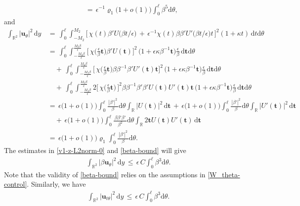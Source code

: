 \documentclass[10pt, reqno]{amsart}
\numberwithin{equation}{section}
\theoremstyle{definition}
\begin{document}
{{\begin{align}
\nonumber\\[2mm]
 & \,=\,
 \epsilon^{-1}\varrho_1\big(1+o(1)\big) \int_0^{\ell} \beta^5 {\mathrm d}\theta,
 \label{v1-s-L2norm}
\end{align}
 and
\begin{align}
 \int_{{\mathbb R}^2} |{\mathbf u}_{\theta}|^2 \,{\mathrm d} y
 &\,=\,
 \int_0^{\ell} \int_{-M_2}^{M_2}
 \Big[\,
 \chi(t)\beta' U\big(\beta t/\epsilon\big)
 \,+\,
 \epsilon^{-1} \chi(t)\beta \beta' U'\big(\beta t/\epsilon\big)t
 \, \Big]^2 (1+\kappa t )\,{\mathrm d}t{\mathrm d}\theta
\nonumber\\[2mm]
 &\,=\,
 \int_0^{\ell} \int_{-\frac{M_2\beta}{\epsilon}}^{\frac{M_2\beta}{\epsilon}}
 \Big[\,\chi\Big(\frac{\epsilon}{\beta}{\mathbf t}\Big)\beta'U({\mathbf t})\Big]^2\,
 \big(1+\epsilon\kappa\beta^{-1}{\mathbf t}\big)\frac{\epsilon}{\beta} \,{\mathrm d}{\mathbf t}{\mathrm d}\theta
\nonumber\\[2mm]
 &\quad\,+\,\int_0^{\ell} \int_{-\frac{M_2\beta}{\epsilon}}^{\frac{M_2\beta}{\epsilon}}
 \Big[\,\chi\Big(\frac{\epsilon}{\beta}{\mathbf t}\Big)\beta\beta^{-1} \beta' U'({\mathbf t}){\mathbf t}\Big]^2\,
 \big(1+\epsilon\kappa\beta^{-1}{\mathbf t}\big)\frac{\epsilon}{\beta} \,{\mathrm d}{\mathbf t}{\mathrm d}\theta
\nonumber\\[2mm]
 &\quad\,+\,\int_0^{\ell} \int_{-\frac{M_2\beta}{\epsilon}}^{\frac{M_2\beta}{\epsilon}}
 2\Big[\,\chi\Big(\frac{\epsilon}{\beta}{\mathbf t}\Big)\,\Big]^2 \beta\beta^{-1} \beta'\beta' U({\mathbf t})U'({\mathbf t}){\mathbf t}\,
 \big(1+\epsilon\kappa\beta^{-1}{\mathbf t}\big)\frac{\epsilon}{\beta} \,{\mathrm d}{\mathbf t}{\mathrm d}\theta
\nonumber\\[2mm]
 & \,=\, \epsilon \big(1+o(1)\big)\int_0^{\ell}
 \frac{\, |\beta'|^2\, }{\beta} {\mathrm d}\theta
 \int_{\mathbb R} |U({\mathbf t})|^2 \,{\mathrm d}{\mathbf t}
 \,+\,
 \epsilon \big(1+o(1)\big)\int_0^{\ell}
 \frac{\, |\beta'|^2\, }{\beta} {\mathrm d}\theta
 \int_{\mathbb R} |U'({\mathbf t})|^2 \,{\mathrm d}{\mathbf t}
\nonumber\\[2mm]
 &\quad\,+\,
 \epsilon \big(1+o(1)\big)\int_0^{\ell}
 \frac{\, \beta\beta'\beta'\, }{\beta^2} {\mathrm d}\theta
 \int_{\mathbb R} 2{\mathbf t}U({\mathbf t})U'({\mathbf t}) \,{\mathrm d}{\mathbf t}
\nonumber\\[2mm]
 & \,=\,
 \epsilon \big(1+o(1)\big)
 \varrho_1\int_0^{\ell} \frac{\, |\beta'|^2\, }{\beta} {\mathrm d}\theta.
 \label{v1-z-L2norm-0}
\end{align}
 The estimates in \eqref{v1-z-L2norm-0} and \eqref{beta-bound} will give
\begin{align}
 \int_{{\mathbb R}^2} |\beta {\mathbf u}_{\theta}|^2 \,{\mathrm d} y
 \,\leq\, \epsilon\, C \int_0^{\ell} \beta^3 {\mathrm d}\theta.
 \label{v1-z-L2norm-1}
\end{align}
 Note that the validity of \eqref{beta-bound} relies on the assumptions in \eqref{W_theta-control}.
 Similarly, we have
\begin{align}
 \int_{{\mathbb R}^2} |{\mathbf u}_{t\theta}|^2 \,{\mathrm d} y
 \,\leq\, \epsilon\, C \int_0^{\ell} \beta^3 {\mathrm d}\theta.
 \label{v1-zt-L2norm-0}
\end{align}

}}
\end{document}
